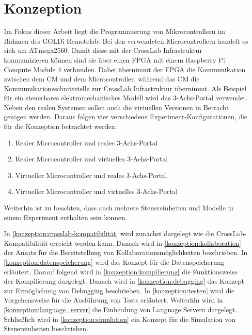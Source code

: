 \chapter{Konzeption} \label{konzeption}

Im Fokus dieser Arbeit liegt die Programmierung von Mikrocontrollern im Rahmen des GOLDi Remotelab. Bei den verwendeten Microcontrollern handelt es sich um ATmega2560. Damit diese mit der CrossLab Infrastruktur kommunizieren können sind sie über einen FPGA mit einem Raspberry Pi Compute Module 4 verbunden. Dabei übernimmt der FPGA die Kommunikation zwischen dem CM und dem Microcontroller, während das CM die Kommunikationsschnittstelle zur CrossLab Infrastruktur übernimmt. Als Beispiel für ein steuerbares elektromechanisches Modell wird das 3-Achs-Portal verwendet. Neben den realen Systemen sollen auch die virtuellen Versionen in Betracht gezogen werden. Daraus folgen vier verschiedene Experiment-Konfigurationen, die für die Konzeption betrachtet werden:

\begin{enumerate}
    \item Realer Microcontroller und reales 3-Achs-Portal
    \item Realer Microcontroller und virtuelles 3-Achs-Portal
    \item Virtueller Microcontroller und reales 3-Achs-Portal
    \item Virtueller Microcontroller und virtuelles 3-Achs-Portal
\end{enumerate}

Weiterhin ist zu beachten, dass auch mehrere Steuereinheiten und Modelle in einem Experiment enthalten sein können.

In \autoref{konzeption:crosslab-kompatibilität} wird zunächst dargelegt wie die CrossLab-Kompatibilität erreicht werden kann. Danach wird in \autoref{konzeption:kollaboration} der Ansatz für die Bereitstellung von Kollaborationsmöglichkeiten beschrieben. In \autoref{konzeption:datenspeicherung} wird das Konzept für die Datenspeicherung erläutert. Darauf folgend wird in \autoref{konzeption:kompilierung} die Funktionsweise der Kompilierung dargelegt. Danach wird in \autoref{konzeption:debugging} das Konzept zur Ermöglichung von Debugging beschrieben. In \autoref{konzeption:testen} wird die Vorgehensweise für die Ausführung von Tests erläutert. Weiterhin wird in \autoref{konzeption:language_server} die Einbindung von Language Servern dargelegt. Schließlich wird in \autoref{konzeption:simulation} ein Konzept für die Simulation von Steuereinheiten beschrieben.








